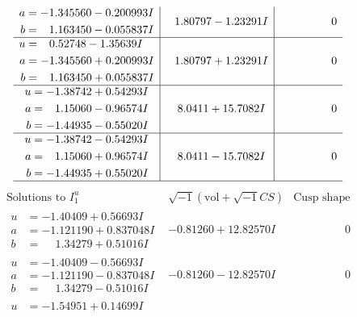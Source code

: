 \documentclass[1p]{elsarticle_modified}
\theoremstyle{definition}
\newcommand{\I}{\sqrt{-1}}
\begin{document}
$$\begin{array}{c|c|c}
\begin{aligned}
a &= -1.345560 - 0.200993 I \\
b &= \phantom{-}1.163450 - 0.055837 I\end{aligned}
 & \phantom{-}1.80797 - 1.23291 I & \phantom{-0.000000 } 0 \\ \hline\begin{aligned}
u &= \phantom{-}0.52748 - 1.35639 I \\
a &= -1.345560 + 0.200993 I \\
b &= \phantom{-}1.163450 + 0.055837 I\end{aligned}
 & \phantom{-}1.80797 + 1.23291 I & \phantom{-0.000000 } 0 \\ \hline\begin{aligned}
u &= -1.38742 + 0.54293 I \\
a &= \phantom{-}1.15060 - 0.96574 I \\
b &= -1.44935 - 0.55020 I\end{aligned}
 & \phantom{-}8.0411 + 15.7082 I & \phantom{-0.000000 } 0 \\ \hline\begin{aligned}
u &= -1.38742 - 0.54293 I \\
a &= \phantom{-}1.15060 + 0.96574 I \\
b &= -1.44935 + 0.55020 I\end{aligned}
 & \phantom{-}8.0411 - 15.7082 I & \phantom{-0.000000 } 0\\
 \hline 
 \end{array}$$\newpage$$\begin{array}{c|c|c}  
\text{Solutions to }I^u_{1}& \I (\text{vol} + \sqrt{-1}CS) & \text{Cusp shape}\\
 \hline 
\begin{aligned}
u &= -1.40409 + 0.56693 I \\
a &= -1.121190 + 0.837048 I \\
b &= \phantom{-}1.34279 + 0.51016 I\end{aligned}
 & -0.81260 + 12.82570 I & \phantom{-0.000000 } 0 \\ \hline\begin{aligned}
u &= -1.40409 - 0.56693 I \\
a &= -1.121190 - 0.837048 I \\
b &= \phantom{-}1.34279 - 0.51016 I\end{aligned}
 & -0.81260 - 12.82570 I & \phantom{-0.000000 } 0 \\ \hline\begin{aligned}
u &= -1.54951 + 0.14699 I \\

\end{aligned}
\end{array}$$
\end{document}
